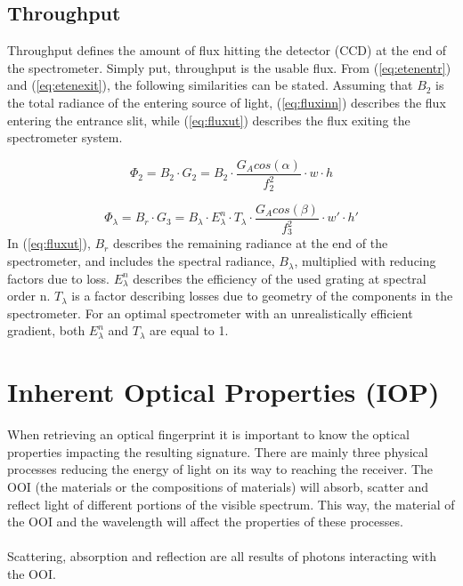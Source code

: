 \subsection{Throughput} \label{sec:tput}
Throughput defines the amount of flux hitting the detector (CCD) at the end of the spectrometer. Simply put, throughput is the usable flux. From (\ref{eq:etenentr}) and (\ref{eq:etenexit}), the following similarities can be stated. Assuming that $B_2$ is the total radiance of the entering source of light, (\ref{eq:fluxinn}) describes the flux entering the entrance slit, while (\ref{eq:fluxut}) describes the flux exiting the spectrometer system. 

\begin{equation}
    \Phi_2 = B_2 \cdot G_2 = B_2 \cdot \frac{G_A cos(\alpha)}{f_2^2} \cdot w \cdot h
    \label{eq:fluxinn}
\end{equation}

\begin{equation}
    \Phi_{\lambda} = B_{r} \cdot G_3 = B_{\lambda}\cdot E_{\lambda}^n \cdot T_{\lambda} \cdot \frac{G_A cos(\beta)}{f_3^2} \cdot w' \cdot h'
    \label{eq:fluxut}
\end{equation}
\noindent
In (\ref{eq:fluxut}), $B_{r}$ describes the remaining radiance at the end of the spectrometer, and includes the spectral radiance, $B_{\lambda}$,  multiplied with reducing factors due to loss. $E_{\lambda}^n$ describes the efficiency of the used grating at spectral order n. $T_{\lambda}$ is a factor describing losses due to geometry of the components in the spectrometer. For an optimal spectrometer with an unrealistically efficient gradient, both $E_{\lambda}^n$ and $T_{\lambda}$ are equal to 1.

\section{Inherent Optical Properties (IOP)}
When retrieving an optical fingerprint it is important to know the optical properties impacting the resulting signature. There are mainly three physical processes reducing the energy of light on its way to reaching the receiver. The OOI (the materials or the compositions of materials) will absorb, scatter and reflect light of different portions of the visible spectrum. This way, the material of the OOI and the wavelength will affect the properties of these processes. 
\\\\
Scattering, absorption and reflection are all results of photons interacting with the OOI. 
